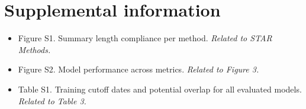 \section*{Supplemental information}

\setcounter{figure}{0}
\setcounter{table}{0}

\label{fig:length_compliance}
\label{fig:supplementary_overview}
\label{tab:training_cutoff_overlap}

\begin{itemize}
    \item Figure S1. Summary length compliance per method. \emph{Related to STAR Methods.}
    \item Figure S2. Model performance across metrics. \emph{Related to Figure 3.}
    \item Table S1. Training cutoff dates and potential overlap for all evaluated models. \emph{Related to Table 3.}
\end{itemize}
